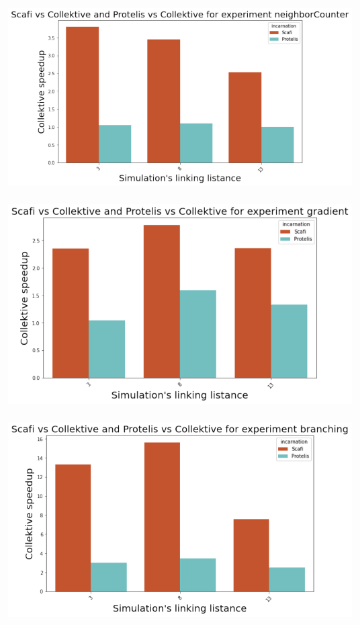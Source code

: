 \begin{figure}[ht!]
    \centering
    \begin{subfigure}[b]{0.49\textwidth}
        \centering
        \includegraphics[width=\textwidth]{figures/neighbor-speedup}
    \end{subfigure}
    \begin{subfigure}[b]{0.49\textwidth}
        \centering
        \includegraphics[width=\textwidth]{figures/gradient-speedup}
    \end{subfigure}
    \begin{subfigure}[b]{0.49\textwidth}
        \centering
        \includegraphics[width=\textwidth]{figures/branching-speedup}

\end{subfigure}
\end{figure}
